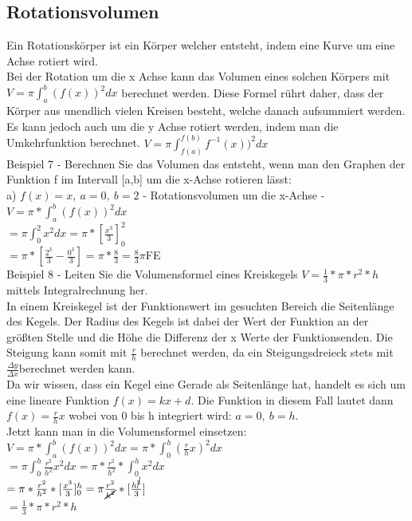 \documentclass{article}
\begin{document}
	\subsection{Rotationsvolumen}
	Ein Rotationskörper ist ein Körper welcher entsteht, indem eine Kurve um eine Achse rotiert wird. \\
	Bei der Rotation um die x Achse kann das Volumen eines solchen Körpers mit $V=\pi \int_{a}^{b}(f(x))^2dx$ berechnet werden. Diese Formel rührt daher, dass der Körper aus unendlich vielen Kreisen besteht, welche danach aufsummiert werden. \\
	Es kann jedoch auch um die y Achse rotiert werden, indem man die Umkehrfunktion berechnet. $V=\pi \int_{f(a)}^{f(b)}f^{-1}(x))^2dx$ \\
	Beispiel 7 - Berechnen Sie das Volumen das entsteht, wenn man den Graphen der Funktion f im Intervall [a,b] um die x-Achse rotieren lässt: \\
	a) $f(x)=x,\ a=0,\ b=2$ - Rotationsvolumen um die x-Achse - $V=\pi*\int_{a}^{b}(f(x))^2dx$ \\
	$=\pi \int_{0}^{2}x^2dx=\pi*[\frac{x^3}{3}]^2_0$ \\
	$=\pi*[\frac{2^3}{3}-\frac{0^3}{3}]=\pi*\frac{8}{3}=\frac{8}{3}\pi$FE \\
	Beispiel 8 - Leiten Sie die Volumensformel eines Kreiskegels $V=\frac{1}{3}*\pi*r^2*h$ mittels Integralrechnung her. \\
	In einem Kreiskegel ist der Funktionswert im gesuchten Bereich die Seitenlänge des Kegels. Der Radius des Kegels ist dabei der Wert der Funktion an der größten Stelle und die Höhe die Differenz der x Werte der Funktionsenden. Die Steigung kann somit mit $\frac{r}{h}$ berechnet werden, da ein Steigungsdreieck stets mit $\frac{\Delta y}{\Delta x} $berechnet werden kann. \\
	Da wir wissen, dass ein Kegel eine Gerade als Seitenlänge hat, handelt es sich um eine lineare Funktion $f(x)=kx+d$. Die Funktion in diesem Fall lautet dann $f(x)=\frac{r}{h}x$ wobei von 0 bis h integriert wird: $a=0,\ b=h$. \\
	Jetzt kann man in die Volumensformel einsetzen: $V=\pi*\int_{a}^{b}(f(x))^2dx=\pi*\int_{0}^{h}(\frac{r}{h}x)^2dx$ \\
	$=\pi \int_{0}^{h}\frac{r^2}{h^2}x^2dx=\pi*\frac{r^2}{h^2}*\int_{0}^{h}x^2dx$ \\
	$=\pi*\frac{r^2}{h^2}*[\frac{x^3}{3}]_0^h=\pi \frac{r^2}{\cancel{h^2}}*[\frac{h^{\cancel{3}}}{3}]$ \\
	$=\frac{1}{3}*\pi*r^2*h$ \\
\end{document}
